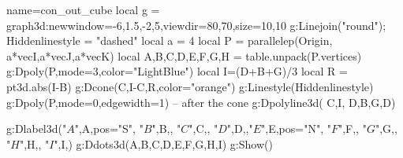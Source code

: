 \begin{luadraw}{name=con_out_cube}
local g = graph3d:new{window={-6,1.5,-2,5},viewdir={80,70},size={10,10}}
g:Linejoin("round"); Hiddenlinestyle = "dashed"
local a = 4
local P = parallelep(Origin, a*vecI,a*vecJ,a*vecK)
local A,B,C,D,E,F,G,H = table.unpack(P.vertices)
g:Dpoly(P,{mode=3,color="LightBlue"})
local I=(D+B+G)/3
local R = pt3d.abs(I-B)
g:Dcone(C,I-C,R,{color="orange"})
g:Linestyle(Hiddenlinestyle) 
g:Dpoly(P,{mode=0,edgewidth=1})  -- after the cone
g:Dpolyline3d( {{C,I}, {D,B,G,D}})
 
g:Dlabel3d("$A$",A,{pos="S"}, "$B$",B,{}, "$C$",C,{}, "$D$",D,{},"$E$",E,{pos="N"}, "$F$",F,{}, "$G$",G,{}, "$H$",H,{}, "$I$",I,{})
 g:Ddots3d({A,B,C,D,E,F,G,H,I})
g:Show()
\end{luadraw}
